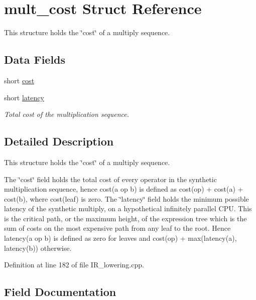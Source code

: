 \hypertarget{structmult__cost}{}\section{mult\+\_\+cost Struct Reference}
\label{structmult__cost}


This structure holds the \char`\"{}cost\char`\"{} of a multiply sequence.  


\subsection*{Data Fields}
\begin{DoxyCompactItemize}
\item 
short \hyperlink{structmult__cost_a774bb4fd78b4f531759034a509ff4784}{cost}
\item 
short \hyperlink{structmult__cost_af78d661d66339eb8b2e6e189be9ba4c3}{latency}
\begin{DoxyCompactList}\small\item\em Total cost of the multiplication sequence. \end{DoxyCompactList}\end{DoxyCompactItemize}


\subsection{Detailed Description}
This structure holds the \char`\"{}cost\char`\"{} of a multiply sequence. 

The \char`\"{}cost\char`\"{} field holds the total cost of every operator in the synthetic multiplication sequence, hence cost(a op b) is defined as cost(op) + cost(a) + cost(b), where cost(leaf) is zero. The \char`\"{}latency\char`\"{} field holds the minimum possible latency of the synthetic multiply, on a hypothetical infinitely parallel C\+PU. This is the critical path, or the maximum height, of the expression tree which is the sum of costs on the most expensive path from any leaf to the root. Hence latency(a op b) is defined as zero for leaves and cost(op) + max(latency(a), latency(b)) otherwise. 

Definition at line 182 of file I\+R\+\_\+lowering.\+cpp.



\subsection{Field Documentation}
\mbox{\label{structmult__cost_a774bb4fd78b4f531759034a509ff4784}} 
